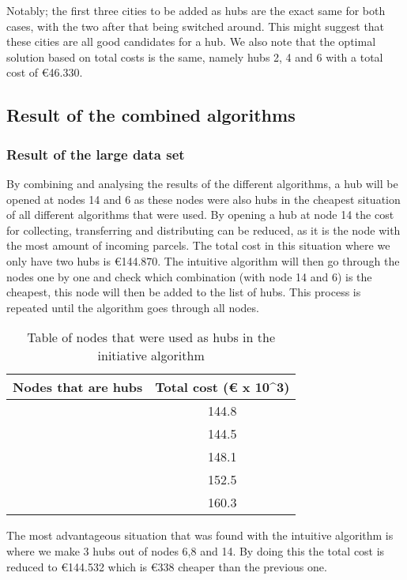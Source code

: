 \documentclass{article}
\begin{document}
Notably; the first three cities to be added as hubs are the exact same for both cases, with the two after that being switched around. This might suggest that these cities are all good candidates for a hub. We also note that the optimal solution based on total costs is the same, namely hubs 2, 4 and 6 with a total cost of €46.330.




\newpage

    
    \subsection{Result of the combined algorithms}
    \subsubsection{Result of the large data set}
    \label{sssec:num2}
By combining and analysing the results of the different algorithms, a hub will be opened at nodes 14 and 6 as these nodes were also hubs in the cheapest situation of all different algorithms that were used. By opening a hub at node 14 the cost for collecting, transferring and distributing can be reduced, as it is the node with the most amount of incoming parcels. The total cost in this situation where we only have two hubs is €144.870. The intuitive algorithm will then go through the nodes one by one and check which combination (with node 14 and 6) is the cheapest, this node will then be added to the list of hubs. This process is repeated until the algorithm goes through all nodes. 

\begin{table}[h]
\begin{tabular}{||c |c||}
\hline

Nodes that are hubs & Total cost (€ x 10^3)\\
\hline\hline
[6,14] &  144.8 \\
\hline
[6,8,14]   & 144.5\\
\hline
[2,6,8,14] & 148.1 \\
\hline
[2,5,6,8,14]  & 152.5  \\
\hline
[2,5,6,8,12,14] & 160.3 \\
\hline
\end{tabular}
\caption{Table of nodes that were used as hubs in the initiative algorithm}
\end{table}

The most advantageous situation that was found with the intuitive algorithm is 
where we make 3 hubs out of nodes 6,8 and 14. By doing this the total cost is reduced to €144.532 which is €338 cheaper than the previous one. 
\end{document}
